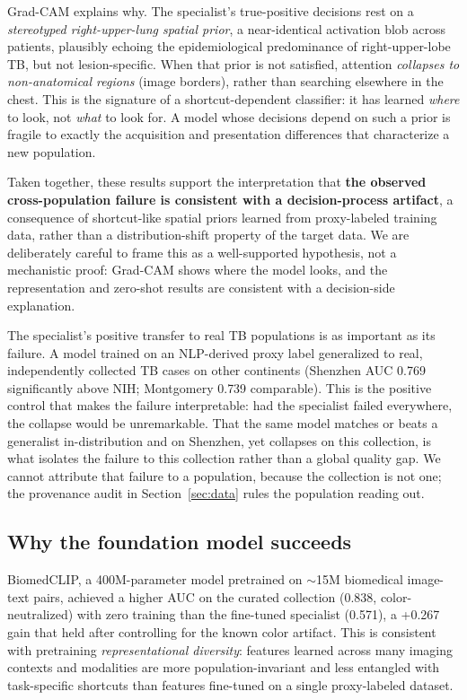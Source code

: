 \documentclass[runningheads]{llncs}
\begin{document}
Grad-CAM explains why. The specialist's true-positive decisions rest on a \emph{stereotyped right-upper-lung spatial prior}, a near-identical activation blob across patients, plausibly echoing the epidemiological predominance of right-upper-lobe TB, but not lesion-specific. When that prior is not satisfied, attention \emph{collapses to non-anatomical regions} (image borders), rather than searching elsewhere in the chest. This is the signature of a shortcut-dependent classifier: it has learned \emph{where} to look, not \emph{what} to look for. A model whose decisions depend on such a prior is fragile to exactly the acquisition and presentation differences that characterize a new population.

Taken together, these results support the interpretation that \textbf{the observed cross-population failure is consistent with a decision-process artifact}, a consequence of shortcut-like spatial priors learned from proxy-labeled training data, rather than a distribution-shift property of the target data. We are deliberately careful to frame this as a well-supported hypothesis, not a mechanistic proof: Grad-CAM shows where the model looks, and the representation and zero-shot results are consistent with a decision-side explanation.

The specialist's positive transfer to real TB populations is as important as its failure. A model trained on an NLP-derived proxy label generalized to real, independently collected TB cases on other continents (Shenzhen AUC 0.769 significantly above NIH; Montgomery 0.739 comparable). This is the positive control that makes the failure interpretable: had the specialist failed everywhere, the collapse would be unremarkable. That the same model matches or beats a generalist in-distribution and on Shenzhen, yet collapses on this collection, is what isolates the failure to this collection rather than a global quality gap. We cannot attribute that failure to a population, because the collection is not one; the provenance audit in Section~\ref{sec:data} rules the population reading out.

\subsection{Why the foundation model succeeds}
BiomedCLIP, a 400M-parameter model pretrained on $\sim$15M biomedical image-text pairs, achieved a higher AUC on the curated collection (0.838, color-neutralized) with zero training than the fine-tuned specialist (0.571), a +0.267 gain that held after controlling for the known color artifact. This is consistent with pretraining \emph{representational diversity}: features learned across many imaging contexts and modalities are more population-invariant and less entangled with task-specific shortcuts than features fine-tuned on a single proxy-labeled dataset.
\end{document}
